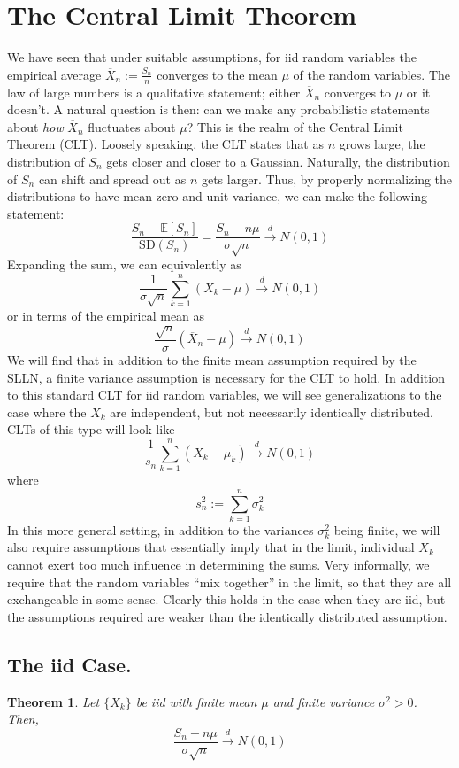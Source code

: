 \documentclass[12pt]{article}
\newcommand{\E}{\mathbb{E}}
\newtheorem{thm}{Theorem}
\begin{document}
\section{The Central Limit Theorem}
We have seen that under suitable assumptions, for iid random variables the empirical average $\overline{X}_n := \frac{S_n}{n}$ converges to the mean $\mu$ of the random variables. 
The law of large numbers is a qualitative statement; either $\overline{X}_n$ converges to $\mu$ or it doesn't. 
A natural question is then: can we make any probabilistic statements about \textit{how} $\overline{X}_n$ fluctuates about $\mu$? This is the realm of the Central Limit Theorem (CLT). 
Loosely speaking, the CLT states that as $n$ grows large, the distribution of $S_n$ gets closer and closer to a Gaussian. Naturally, the distribution of $S_n$ can shift and spread out 
as $n$ gets larger. Thus, by properly normalizing the distributions to have mean zero and unit variance, we can make the following statement: 
\[\frac{S_n - \E[S_n]}{\text{SD}(S_n)} = \frac{S_n - n\mu}{\sigma \sqrt{n}} \overset{d}{\to} N(0, 1)\]
Expanding the sum, we can equivalently as
\[\frac{1}{\sigma \sqrt{n}} \sum_{k = 1}^{n} (X_k - \mu) \overset{d}{\to} N(0, 1)\]
or in terms of the empirical mean as
\[\frac{\sqrt{n}}{\sigma} (\overline{X}_n - \mu) \overset{d}{\to} N(0, 1)\]
We will find that in addition to the finite mean assumption required by the SLLN, a finite variance assumption is necessary for the CLT to hold. 
In addition to this standard CLT for iid random variables, we will see generalizations to the case where the $X_k$ are independent, but not necessarily identically distributed. CLTs of 
this type will look like
\[\frac{1}{s_n} \sum_{k = 1}^{n} (X_k - \mu_k) \overset{d}{\to} N(0, 1)\]
where 
\[s_n^2 := \sum_{k = 1}^{n} \sigma_k^2 \]
In this more general setting, in addition to the variances $\sigma_k^2$ being finite, we will also require assumptions that essentially imply that in the limit, individual $X_k$ cannot exert
too much influence in determining the sums. Very informally, we require that the random variables ``mix together'' in the limit, so that they are all exchangeable in some sense. Clearly this 
holds in the case when they are iid, but the assumptions required are weaker than the identically distributed assumption. 

\subsection{The iid Case.}
\begin{thm}
Let $\{X_k\}$ be iid with finite mean $\mu$ and finite variance $\sigma^2 > 0$. Then, 
\[\frac{S_n - n\mu}{\sigma \sqrt{n}} \overset{d}{\to} N(0, 1)\]
\end{thm}
\end{document}
